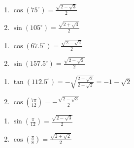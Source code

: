 \begin{multicols}{2}

\begin{enumerate}

\setcounter{enumi}{\value{HW}}

\addtocounter{enumi}{18}

\item $\cos(75^{\circ}) = \frac{\sqrt{2-\sqrt{3}}}{2}$ 
\item $\sin(105^{\circ}) = \frac{\sqrt{2+\sqrt{3}}}{2}$ 

\setcounter{HW}{\value{enumi}}

\end{enumerate}

\end{multicols}

\begin{multicols}{2}

\begin{enumerate}

\setcounter{enumi}{\value{HW}}

\item $\cos(67.5^{\circ})  = \frac{\sqrt{2-\sqrt{2}}}{2}$ 
\item $\sin(157.5^{\circ}) = \frac{\sqrt{2-\sqrt{2}}}{2}$ 

\setcounter{HW}{\value{enumi}}

\end{enumerate}

\end{multicols}

\begin{multicols}{2}

\begin{enumerate}

\setcounter{enumi}{\value{HW}}

\item $\tan(112.5^{\circ}) = - \sqrt{\frac{2+\sqrt{2}}{2-\sqrt{2}}} = -1 - \sqrt{2}$
\item $\cos\left( \frac{7\pi}{12} \right) = -\frac{\sqrt{2-\sqrt{3}}}{2}$  

\setcounter{HW}{\value{enumi}}

\end{enumerate}

\end{multicols}

\begin{multicols}{2}

\begin{enumerate}

\setcounter{enumi}{\value{HW}}

\item $\sin\left( \frac{\pi}{12} \right) = \frac{\sqrt{2-\sqrt{3}}}{2}$ 
\item $\cos \left( \frac{\pi}{8} \right) = \frac{\sqrt{2 + \sqrt{2}}}{2}$

\setcounter{HW}{\value{enumi}}

\end{enumerate}

\end{multicols}

